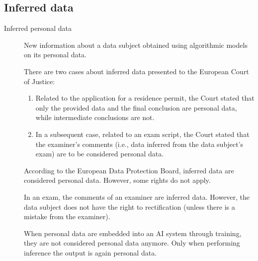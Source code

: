 \subsection{Inferred data}

\begin{description}
    \item[Inferred personal data] 
        New information about a data subject obtained using algorithmic models on its personal data.

    \begin{remark}
        There are two cases about inferred data presented to the European Court of Justice:
        \begin{enumerate}
            \item Related to the application for a residence permit, the Court stated that only the provided data and the final conclusion are personal data, while intermediate conclusions are not.
            \item In a subsequent case, related to an exam script, the Court stated that the examiner's comments (i.e., data inferred from the data subject's exam) are to be considered personal data.
        \end{enumerate}
    \end{remark}
    
    \begin{remark}
        According to the European Data Protection Board, inferred data are considered personal data. However, some rights do not apply.
        
        \indenttbox
        \begin{example}
            In an exam, the comments of an examiner are inferred data. However, the data subject does not have the right to rectification (unless there is a mistake from the examiner).
        \end{example}
    \end{remark}

    \begin{remark}
        When personal data are embedded into an AI system through training, they are not considered personal data anymore. Only when performing inference the output is again personal data.
    \end{remark}
\end{description}

